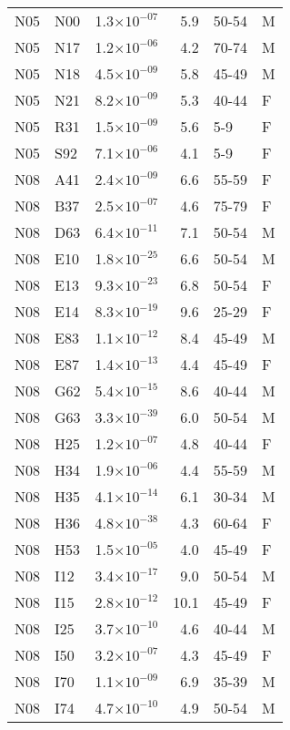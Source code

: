 \begin{longtable}{lllrll}
   N05 & N00 & 1.3$\times10^{-07}$ & 5.9 & 50-54 & M \\ 
   N05 & N17 & 1.2$\times10^{-06}$ & 4.2 & 70-74 & M \\ 
   N05 & N18 & 4.5$\times10^{-09}$ & 5.8 & 45-49 & M \\ 
   N05 & N21 & 8.2$\times10^{-09}$ & 5.3 & 40-44 & F \\ 
   N05 & R31 & 1.5$\times10^{-09}$ & 5.6 & 5-9 & F \\ 
   N05 & S92 & 7.1$\times10^{-06}$ & 4.1 & 5-9 & F \\ 
   N08 & A41 & 2.4$\times10^{-09}$ & 6.6 & 55-59 & F \\ 
   N08 & B37 & 2.5$\times10^{-07}$ & 4.6 & 75-79 & F \\ 
   N08 & D63 & 6.4$\times10^{-11}$ & 7.1 & 50-54 & M \\ 
   N08 & E10 & 1.8$\times10^{-25}$ & 6.6 & 50-54 & M \\ 
   N08 & E13 & 9.3$\times10^{-23}$ & 6.8 & 50-54 & F \\ 
   N08 & E14 & 8.3$\times10^{-19}$ & 9.6 & 25-29 & F \\ 
   N08 & E83 & 1.1$\times10^{-12}$ & 8.4 & 45-49 & M \\ 
   N08 & E87 & 1.4$\times10^{-13}$ & 4.4 & 45-49 & F \\ 
   N08 & G62 & 5.4$\times10^{-15}$ & 8.6 & 40-44 & M \\ 
   N08 & G63 & 3.3$\times10^{-39}$ & 6.0 & 50-54 & M \\ 
   N08 & H25 & 1.2$\times10^{-07}$ & 4.8 & 40-44 & F \\ 
   N08 & H34 & 1.9$\times10^{-06}$ & 4.4 & 55-59 & M \\ 
   N08 & H35 & 4.1$\times10^{-14}$ & 6.1 & 30-34 & M \\ 
   N08 & H36 & 4.8$\times10^{-38}$ & 4.3 & 60-64 & F \\ 
   N08 & H53 & 1.5$\times10^{-05}$ & 4.0 & 45-49 & F \\ 
   N08 & I12 & 3.4$\times10^{-17}$ & 9.0 & 50-54 & M \\ 
   N08 & I15 & 2.8$\times10^{-12}$ & 10.1 & 45-49 & F \\ 
   N08 & I25 & 3.7$\times10^{-10}$ & 4.6 & 40-44 & M \\ 
   N08 & I50 & 3.2$\times10^{-07}$ & 4.3 & 45-49 & F \\ 
   N08 & I70 & 1.1$\times10^{-09}$ & 6.9 & 35-39 & M \\ 
   N08 & I74 & 4.7$\times10^{-10}$ & 4.9 & 50-54 & M \\ 

\end{longtable}

